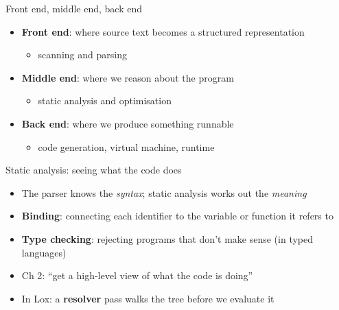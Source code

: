 \documentclass[
  ignorenonframetext,
]{beamer}
\providecommand{\tightlist}{%
  \setlength{\itemsep}{0pt}\setlength{\parskip}{0pt}}
\begin{document}
\begin{frame}{Front end, middle end, back end}
\label{front-end-middle-end-back-end}
\begin{itemize}
\tightlist
\item
  \textbf{Front end}: where source text becomes a structured
  representation

  \begin{itemize}
  \tightlist
  \item
    scanning and parsing
  \end{itemize}
\item
  \textbf{Middle end}: where we reason about the program

  \begin{itemize}
  \tightlist
  \item
    static analysis and optimisation
  \end{itemize}
\item
  \textbf{Back end}: where we produce something runnable

  \begin{itemize}
  \tightlist
  \item
    code generation, virtual machine, runtime
  \end{itemize}
\end{itemize}

\end{frame}

\begin{frame}{Static analysis: seeing what the code does}
\label{static-analysis-seeing-what-the-code-does}
\begin{itemize}
\tightlist
\item
  The parser knows the \emph{syntax}; static analysis works out the
  \emph{meaning}
\item
  \textbf{Binding}: connecting each identifier to the variable or
  function it refers to
\item
  \textbf{Type checking}: rejecting programs that don't make sense (in
  typed languages)
\item
  Ch 2: ``get a high-level view of what the code is doing''
\item
  In Lox: a \textbf{resolver} pass walks the tree before we evaluate it
\end{itemize}

\end{frame}
\end{document}
